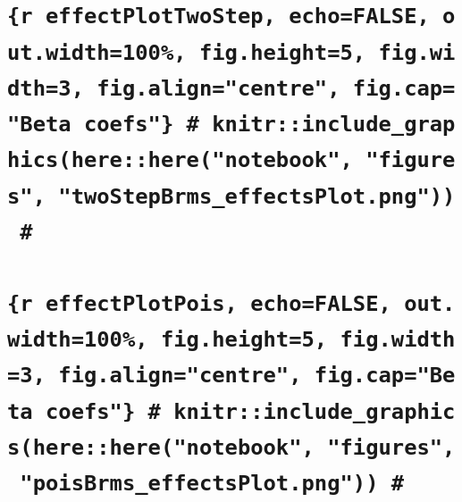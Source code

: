 \documentclass[10pt,a4paper]{article}
\begin{document}
\section{}\label{section-1}

\section{\texorpdfstring{\texttt{\{r\ effectPlotTwoStep,\ echo=FALSE,\ out.width=\textquotesingle{}100\%\textquotesingle{},\ fig.height=5,\ fig.width=3,\ fig.align="centre",\ fig.cap="Beta\ coefs"\}\ \#\ knitr::include\_graphics(here::here("notebook",\ "figures",\ "twoStepBrms\_effectsPlot.png"))\ \#}}{\{r effectPlotTwoStep, echo=FALSE, out.width=\%\textquotesingle, fig.height=5, fig.width=3, fig.align="centre", fig.cap="Beta coefs"\} \# knitr::include\_graphics(here::here("notebook", "figures", "twoStepBrms\_effectsPlot.png")) \#}}\label{r-effectplottwostep-echofalse-out.width100-fig.height5-fig.width3-fig.aligncentre-fig.capbeta-coefs-knitrinclude_graphicshereherenotebook-figures-twostepbrms_effectsplot.png}

\section{}\label{section-2}

\section{\texorpdfstring{\texttt{\{r\ effectPlotPois,\ echo=FALSE,\ out.width=\textquotesingle{}100\%\textquotesingle{},\ fig.height=5,\ fig.width=3,\ fig.align="centre",\ fig.cap="Beta\ coefs"\}\ \#\ knitr::include\_graphics(here::here("notebook",\ "figures",\ "poisBrms\_effectsPlot.png"))\ \#}}{\{r effectPlotPois, echo=FALSE, out.width=\%\textquotesingle, fig.height=5, fig.width=3, fig.align="centre", fig.cap="Beta coefs"\} \# knitr::include\_graphics(here::here("notebook", "figures", "poisBrms\_effectsPlot.png")) \#}}\label{r-effectplotpois-echofalse-out.width100-fig.height5-fig.width3-fig.aligncentre-fig.capbeta-coefs-knitrinclude_graphicshereherenotebook-figures-poisbrms_effectsplot.png}

\clearpage
\end{document}
